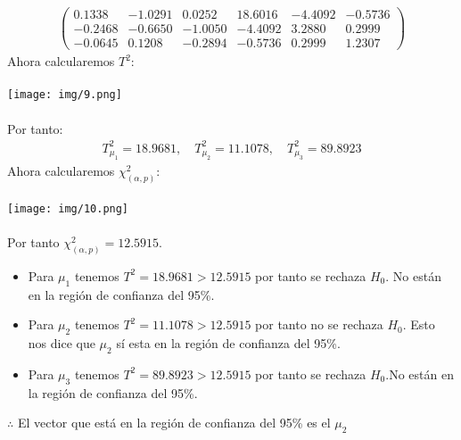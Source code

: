 \begin{sol}
\begin{itemize}
\begin{align*}
\begin{pmatrix}
  0.1338 & -1.0291 &  0.0252 & 18.6016 & -4.4092 & -0.5736 \\
 -0.2468 & -0.6650 & -1.0050 & -4.4092 &  3.2880 &  0.2999 \\
 -0.0645 &  0.1208 & -0.2894 & -0.5736 &  0.2999 &  1.2307
\end{pmatrix}
\end{align*}
Ahora calcularemos $T^2$:\\\\
\texttt{[image: img/9.png]}\\\\
Por tanto:
\begin{align*}
T_{\mu_1}^2=18.9681,\quad T_{\mu_2}^2=11.1078,\quad T_{\mu_3}^2=89.8923
\end{align*}
Ahora calcularemos $\chi_{(\alpha,p)}^2$:\\\\
\texttt{[image: img/10.png]}\\\\
Por tanto $\chi_{(\alpha,p)}^2=12.5915$.
\begin{itemize}
\item Para $\mu_1$ tenemos $T^2=18.9681 > 12.5915$ por tanto se rechaza $H_0$. No están en la región de confianza del 95\%.
\item Para $\mu_2$ tenemos $T^2=11.1078 > 12.5915$ por tanto no se rechaza $H_0$. Esto nos dice que $\mu_2$ sí esta en la región de confianza del 95\%.
\item Para $\mu_3$ tenemos $T^2=89.8923 > 12.5915$ por tanto se rechaza $H_0$.No están en la región de confianza del 95\%.
\end{itemize}
$\therefore$ El vector que está en la región de confianza del 95\% es el $\mu_2$ \pagebreak


\end{itemize}
\end{sol}
